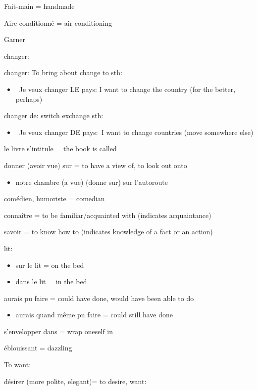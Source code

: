 Fait-main = handmade~

Aire conditionné = air conditioning~

Garner

changer:

changer: To bring about change to sth:

\begin{itemize}
\item
  ~Je veux changer LE pays: I want to change the country (for the
  better, perhaps)
\end{itemize}

changer de: switch exchange sth:

\begin{itemize}
\item
  ~Je veux changer DE pays:~I want to change countries (move somewhere
  else)
\end{itemize}

le livre s'intitule = the book is called

donner (avoir vue) sur = to have a view of, to look out onto

\begin{itemize}
\item
  notre chambre (a vue) (donne sur) sur l'autoroute
\end{itemize}

comédien, humoriste = comedian

connaître = to be familiar/acquainted with (indicates acquaintance)

savoir = to know how to (indicates knowledge of a fact or an action)

lit:

\begin{itemize}
\item
  {sur} le lit = {on} the bed
\item
  {dans} le lit = {in} the bed
\end{itemize}

aurais pu faire = could have done, would have been able to do

\begin{itemize}
\item
  aurais quand même pu faire = could {still} have done
\end{itemize}

s'envelopper dans = wrap oneself in

éblouissant = dazzling

To want:

désirer (more polite, elegant)= to desire, want:

